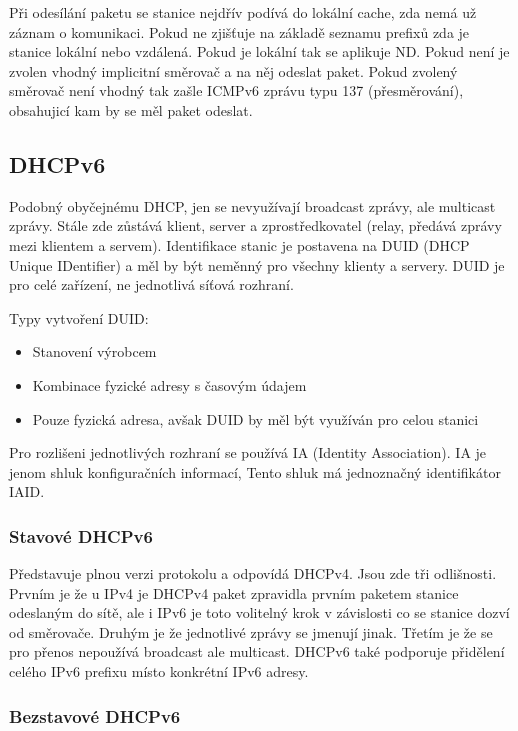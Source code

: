 Při odesílání paketu se stanice nejdřív podívá do lokální cache, zda nemá už záznam o komunikaci.
Pokud ne zjišťuje na základě seznamu prefixů zda je stanice lokální nebo vzdálená.
Pokud je lokální tak se aplikuje ND.
Pokud není je zvolen vhodný implicitní směrovač a na něj odeslat paket.
Pokud zvolený směrovač není vhodný tak zašle ICMPv6 zprávu typu 137 (přesměrování), obsahujicí kam by se měl paket odeslat.

\subsection{DHCPv6}

Podobný obyčejnému DHCP, jen se nevyužívají broadcast zprávy, ale multicast zprávy.
Stále zde zůstává klient, server a zprostředkovatel (relay, předává zprávy mezi klientem a servem).
Identifikace stanic je postavena na DUID (DHCP Unique IDentifier) a měl by být neměnný pro všechny klienty a servery.
DUID je pro celé zařízení, ne jednotlivá síťová rozhraní.

Typy vytvoření DUID:

\begin{itemize}[noitemsep]
    \item Stanovení výrobcem
    \item Kombinace fyzické adresy s časovým údajem
    \item Pouze fyzická adresa, avšak DUID by měl být využíván pro celou stanici
\end{itemize}

Pro rozlišeni jednotlivých rozhraní se používá IA (Identity Association). IA je jenom shluk konfiguračních informací, Tento shluk má jednoznačný identifikátor IAID.

\subsubsection{Stavové DHCPv6}

Představuje plnou verzi protokolu a odpovídá DHCPv4.
Jsou zde tři odlišnosti.
Prvním je že u IPv4 je DHCPv4 paket zpravidla prvním paketem stanice odeslaným do sítě, ale i IPv6 je toto volitelný krok v závislosti co se stanice dozví od směrovače.
Druhým je že jednotlivé zprávy se jmenují jinak.
Třetím je že se pro přenos nepoužívá broadcast ale multicast.
DHCPv6 také podporuje přidělení celého IPv6 prefixu místo konkrétní IPv6 adresy.

\subsubsection{Bezstavové DHCPv6}

